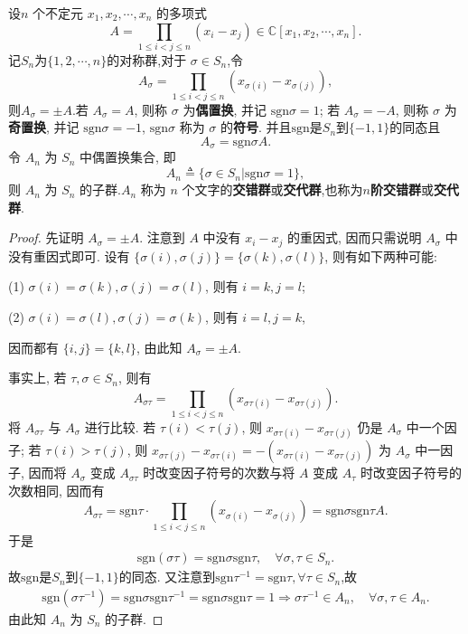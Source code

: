 \documentclass[../../main.tex]{subfiles}%
\begin{document}
\begin{theorem}\label{theorem:奇置换与偶置换}
设\( n \) 个不定元 \( x_1, x_2, \cdots, x_n \) 的多项式
\[
A = \prod_{1 \leqslant i < j \leqslant n} (x_i - x_j) \in \mathbb{C}[x_1, x_2, \cdots, x_n].
\]
记$S_n$为$\{1,2,\cdots,n\}$的对称群,对于 \( \sigma \in S_n \),令
\[
A_\sigma = \prod_{1 \leqslant i < j \leqslant n} (x_{\sigma(i)} - x_{\sigma(j)}),
\]
则$A_{\sigma}=\pm A$.若 \( A_\sigma = A \), 则称 \( \sigma \) 为\textbf{偶置换}, 并记 \( \text{sgn}\sigma = 1 \); 若 \( A_\sigma = -A \), 则称 \( \sigma \) 为\textbf{奇置换}, 并记 \( \text{sgn}\sigma = -1 \), \( \text{sgn}\sigma \) 称为 \( \sigma \) 的\textbf{符号}. 并且$\text{sgn}$是$S_n$到$\{-1,1\}$的同态且
\[
A_\sigma = \text{sgn}\sigma A.
\]
令 \( A_n \) 为 \( S_n \) 中偶置换集合, 即
\[
A_n \triangleq \{\sigma \in S_n|\text{sgn}\sigma = 1\},
\]
则 \( A_n \) 为 \( S_n \) 的子群.\( A_n \) 称为 \( n \) 个文字的\textbf{交错群}或\textbf{交代群},也称为\textbf{$n$阶交错群}或\textbf{交代群}.
\end{theorem}
\begin{proof}
先证明 \( A_\sigma = \pm A \). 注意到 \( A \) 中没有 \( x_i - x_j \) 的重因式, 因而只需说明 \( A_\sigma \) 中没有重因式即可. 设有 \( \{\sigma(i), \sigma(j)\} = \{\sigma(k), \sigma(l)\} \), 则有如下两种可能:

(1) \( \sigma(i) = \sigma(k), \sigma(j) = \sigma(l) \), 则有 \( i = k, j = l \);

(2) \( \sigma(i) = \sigma(l), \sigma(j) = \sigma(k) \), 则有 \( i = l, j = k \),

因而都有 \( \{i, j\} = \{k, l\} \), 由此知 \( A_\sigma = \pm A \).

事实上, 若 \( \tau, \sigma \in S_n \), 则有
\[
A_{\sigma\tau} = \prod_{1 \leqslant i < j \leqslant n} (x_{\sigma\tau(i)} - x_{\sigma\tau(j)}).
\]
将 \( A_{\sigma\tau} \) 与 \( A_\sigma \) 进行比较. 若 \( \tau(i) < \tau(j) \), 则 \( x_{\sigma\tau(i)} - x_{\sigma\tau(j)} \) 仍是 \( A_\sigma \) 中一个因子; 若 \( \tau(i) > \tau(j) \), 则 \( x_{\sigma\tau(j)} - x_{\sigma\tau(i)} = -(x_{\sigma\tau(i)} - x_{\sigma\tau(j)}) \) 为 \( A_\sigma \) 中一因子, 因而将 \( A_\sigma \) 变成 \( A_{\sigma\tau} \) 时改变因子符号的次数与将 \( A \) 变成 \( A_\tau \) 时改变因子符号的次数相同, 因而有
\[
A_{\sigma\tau} = \text{sgn}\tau \cdot \prod_{1 \leqslant i < j \leqslant n} (x_{\sigma(i)} - x_{\sigma(j)}) = \text{sgn}\sigma\text{sgn}\tau A.
\]
于是
\begin{align*}
\text{sgn}(\sigma\tau) = \text{sgn}\sigma\text{sgn}\tau, \quad \forall \sigma, \tau \in S_n.
\end{align*}
故$\text{sgn}$是$S_n$到$\{-1,1\}$的同态.
又注意到$\text{sgn}\tau^{-1}=\text{sgn}\tau,  \forall \tau \in S_n$,故
\begin{align*}
\text{sgn}(\sigma\tau^{-1}) = \text{sgn}\sigma\text{sgn}\tau^{-1}=\text{sgn}\sigma\text{sgn}\tau=1\Longrightarrow \sigma\tau^{-1}\in A_n, \quad \forall \sigma, \tau \in A_n.
\end{align*}
由此知 \( A_n \) 为 \( S_n \) 的子群.
\end{proof}
\end{document}
